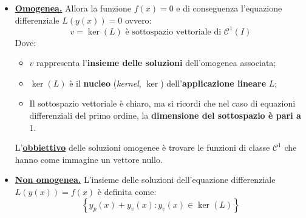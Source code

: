 \documentclass[a4paper]{article}
\begin{document}
	\begin{itemize}[label=]
		\item \textcolor{Red3}{\textbf{\underline{Omogenea.}}} Allora la funzione $f\left(x\right) = 0$ e di conseguenza l'equazione differenziale $L\left(y\left(x\right)\right) = 0$ ovvero:
		\begin{equation*}
			v = \ker\left(L\right) \text{ è sottospazio vettoriale di } \mathcal{C}^{1}\left(I\right)
		\end{equation*}
		Dove:
		\begin{itemize}[label=-]
			\item $v$ rappresenta l'\textbf{insieme delle soluzioni} dell'omogenea associata;			
			\item $\ker\left(L\right)$ è il \textbf{nucleo} (\emph{kernel}, $\ker$) dell'\textbf{applicazione lineare} $L$;
			\item Il sottospazio vettoriale è chiaro, ma si ricordi che nel caso di equazioni differenziali del primo ordine, la \textbf{dimensione del sottospazio è pari a} $1$.
		\end{itemize}
		L'\textbf{\underline{obbiettivo}} delle soluzioni omogenee è trovare le funzioni di classe $\mathcal{C}^{1}$ che hanno come immagine un vettore nullo.
		
		\item \textcolor{Red3}{\textbf{\underline{Non omogenea.}}} L'insieme delle soluzioni dell'equazione differenziale $L\left(y\left(x\right)\right) = f\left(x\right)$ è definita come:
		\begin{equation*}
			\left\{y_{p}\left(x\right) + y_{v}\left(x\right) : y_{v}\left(x\right) \in \ker\left(L\right)\right\}
		\end{equation*}
	\end{itemize}
\end{document}
